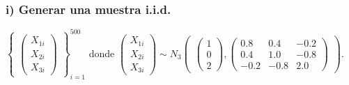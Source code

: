 \documentclass[
]{article}
\author{}
\date{\vspace{-2.5em}}
\begin{document}
\subsubsection{i) Generar una muestra
i.i.d.}\label{i-generar-una-muestra-i.i.d.}

\(\begin{Bmatrix}\begin{pmatrix} X_{1i} \\ X_{2i} \\ X_{3i} \end{pmatrix}\end{Bmatrix}_{i=1}^{500}\)
donde
\(\begin{pmatrix} X_{1i} \\ X_{2i} \\ X_{3i} \end{pmatrix} \sim{N_3} \begin{pmatrix} \begin{pmatrix} 1\\ 0\\ 2 \end{pmatrix}, \begin{pmatrix} 0.8 & 0.4 & -0.2\\ 0.4 & 1.0 & -0.8 \\ -0.2 & -0.8 & 2.0 \end{pmatrix}\end{pmatrix}\).
\end{document}
